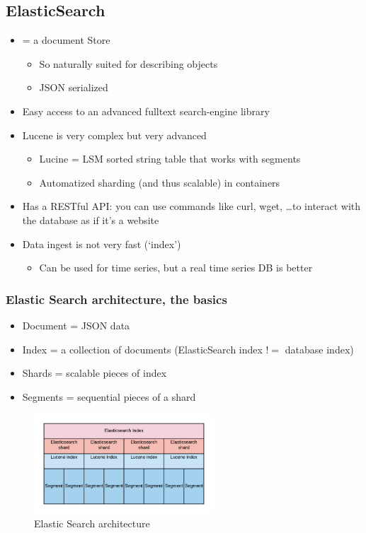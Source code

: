 \documentclass{article}
\begin{document}
\subsection{ElasticSearch}

\begin{itemize}
    \item = a document Store
    \begin{itemize}
        \item So naturally suited for describing objects
        \item JSON serialized
    \end{itemize}
    \item Easy access to an advanced fulltext search-engine library
    \item Lucene is very complex but very advanced
    \begin{itemize}
        \item Lucine = LSM sorted string table that works with segments
        \item Automatized sharding (and thus scalable) in containers
    \end{itemize}
    \item Has a RESTful API: you can use commands like curl, wget, \dots to interact with the database as if it's a website
    \item Data ingest is not very fast (`index')
    \begin{itemize}
        \item Can be used for time series, but a real time series DB is better
    \end{itemize}
\end{itemize}

\subsubsection{Elastic Search architecture, the basics}

\begin{itemize}
    \item Document = JSON data
    \item Index = a collection of documents (ElasticSearch index $!=$ database index)
    \item Shards = scalable pieces of index
    \item Segments = sequential pieces of a shard
\end{itemize}

\begin{figure}[H]
    \centering
    \includegraphics[width=0.6\textwidth]{elasticsearch-architecture.png}
    \caption{Elastic Search architecture}
\end{figure}
\end{document}
